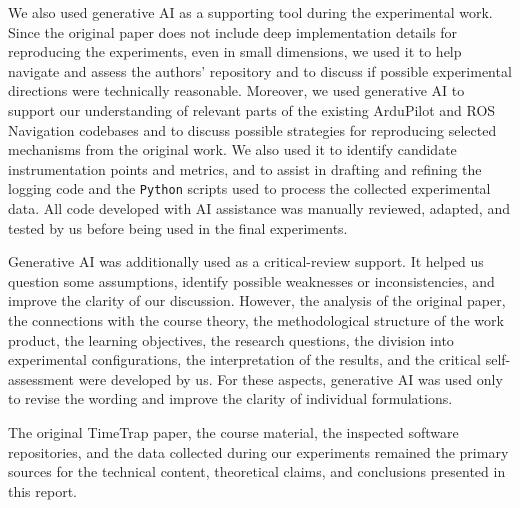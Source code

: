\noindent We also used generative AI as a supporting tool during the experimental work. Since the original paper does not include deep implementation details for reproducing the experiments, even in small dimensions, we used it to help navigate and assess the authors' repository and to discuss if possible experimental directions were technically reasonable. Moreover, we used generative AI to support our understanding of relevant parts of the existing ArduPilot and ROS Navigation codebases and to discuss possible strategies for reproducing selected mechanisms from the original work. We also used it to identify candidate instrumentation points and metrics, and to assist in drafting and refining the logging code and the \texttt{Python} scripts used to process the collected experimental data. All code developed with AI assistance was manually reviewed, adapted, and tested by us before being used in the final experiments.

\noindent Generative AI was additionally used as a critical-review support. It helped us question some assumptions, identify possible weaknesses or inconsistencies, and improve the clarity of our discussion. However, the analysis of the original paper, the connections with the course theory, the methodological structure of the work product, the learning objectives, the research questions, the division into experimental configurations, the interpretation of the results, and the critical self-assessment were developed by us. For these aspects, generative AI was used only to revise the wording and improve the clarity of individual formulations.

\noindent The original TimeTrap paper, the course material, the inspected software repositories, and the data collected during our experiments remained the primary sources for the technical content, theoretical claims, and conclusions presented in this report. 